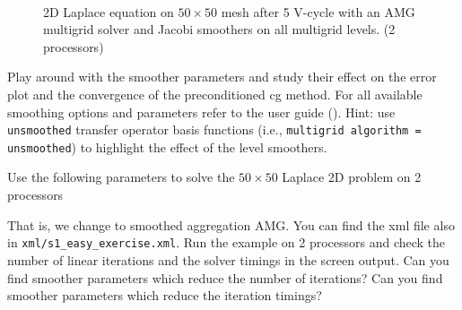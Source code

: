\documentclass[10pt,fleqn]{book}
\begin{document}
\begin{figure}
\hspace{0.03\textwidth}
\hspace{0.03\textwidth}
 \\
\caption{2D Laplace equation on $50\times 50$ mesh after 5 V-cycle with an AMG multigrid solver and Jacobi smoothers on all multigrid levels. (2 processors)}
\label{fig:5vcycles}
\end{figure}

\begin{exercise}
Play around with the smoother parameters and study their effect on the error plot and the convergence of the preconditioned cg method. For all available smoothing options and parameters refer to the \muelu user guide (\cite{Mue}). Hint: use \texttt{unsmoothed} transfer operator basis functions (i.e., \texttt{multigrid algorithm = unsmoothed}) to highlight the effect of the level smoothers.
\end{exercise}
\begin{exercise}
Use the following parameters to solve the $50\times 50$ Laplace 2D problem on 2 processors
 
 That is, we change to smoothed aggregation AMG. You can find the xml file also in \texttt{xml/s1\_easy\_exercise.xml}.
 Run the example on 2 processors and check the number of linear iterations and the solver timings in the screen output.
 Can you find smoother parameters which reduce the number of iterations? Can you find smoother parameters which reduce the iteration timings?
\end{exercise}
\end{document}
